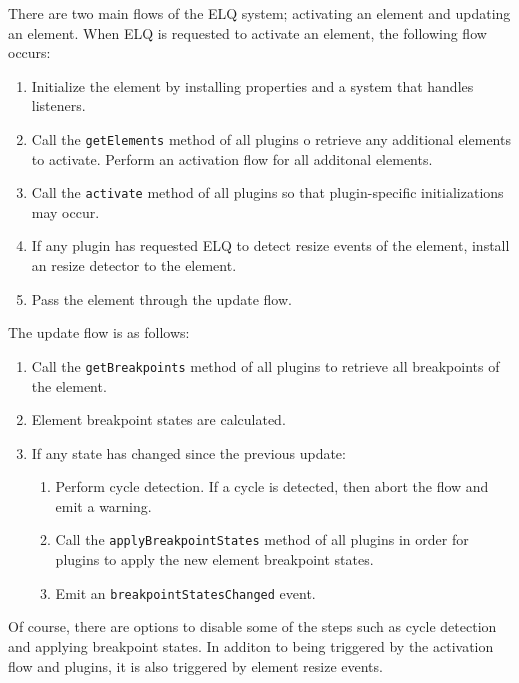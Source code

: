 \documentclass{acm_proc_article-sp}
\newcommand{\code}[1]{\texttt{#1}}
\newcommand{\elq}{ELQ}
\begin{document}
  There are two main flows of the \elq{} system; activating an element and updating an element.
  When \elq{} is requested to activate an element, the following flow occurs:

  \begin{enumerate}
    \item Initialize the element by installing properties and a system that handles listeners.
    \item 
          Call the \code{getElements} method of all plugins o retrieve any additional elements to activate.
          Perform an activation flow for all additonal elements.
    \item Call the \code{activate} method of all plugins so that plugin-specific initializations may occur.
    \item If any plugin has requested \elq{} to detect resize events of the element, install an resize detector to the element.
    \item Pass the element through the update flow.
  \end{enumerate}

  The update flow is as follows:
  \begin{enumerate}
    \item Call the \code{getBreakpoints} method of all plugins to retrieve all breakpoints of the element.
    \item Element breakpoint states are calculated.
    \item If any state has changed since the previous update:
    \begin{enumerate}
      \item Perform cycle detection. If a cycle is detected, then abort the flow and emit a warning.
      \item Call the \code{applyBreakpointStates} method of all plugins in order for plugins to apply the new element breakpoint states.
      \item Emit an \code{breakpointStatesChanged} event.
    \end{enumerate}
  \end{enumerate}

  Of course, there are options to disable some of the steps such as cycle detection and applying breakpoint states.
  In additon to being triggered by the activation flow and plugins, it is also triggered by element resize events.
\end{document}
